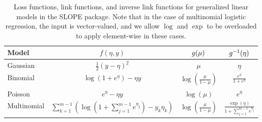 \documentclass[article]{jss}
\begin{document}
\begin{table}[t!]
  \centering
  \label{tab:glm}
  \begin{tabular}{lccc}
    \toprule
    Model       & \(f(\eta, y)\)                                                                                       & \(g(\mu)\)                            & \(g^{-1}(\eta)\)                                       \\
    \midrule
    Gaussian    & \(\frac{1}{2}(y - \eta)^2\)                                                                          & \(\mu\)                                   & \(\eta\)                                               \\
    \addlinespace
    Binomial    & \(\log(1 + e^\eta) - \eta y\)                                                                        & \(\log \left(\frac{\mu}{1 - \mu}\right)\) & \(\frac{e^\eta}{1 + e^\eta}\)                          \\
    \addlinespace
    Poisson     & \(e^\eta - \eta y\)                                                                                  & \(\log(\mu)\)                             & \(e^\eta\)                                             \\
    \addlinespace
    Multinomial & \(\sum_{k=1}^{m-1}\left( \log \left( 1 +  \sum_{j=1}^{m-1} e^{\eta_j}\right) - y_k \eta_k  \right)\) & \(\log\left(\frac{\mu}{1 - \mu}\right) \) & \(\frac{\exp(\eta)}{1 + \sum_{j=1}^{m-1} e^{\eta_j}}\) \\
    \bottomrule
  \end{tabular}
  \caption{Loss functions, link functions, and inverse link functions for
    generalized linear models in the SLOPE package. Note that in the case of
    multinomial logistic regression, the input is vector-valued, and we allow
    \(\log\) and \(\exp\) to be overloaded to apply element-wise in these cases.
  }
\end{table}
\end{document}
